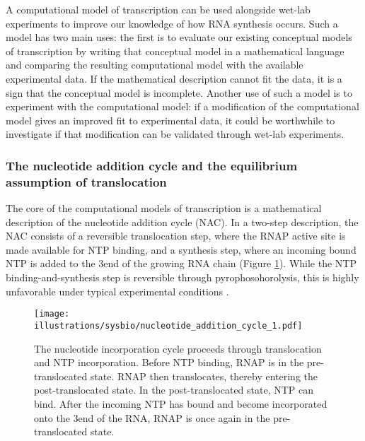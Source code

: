 %
%
A computational model of transcription can be used alongside wet-lab experiments
to improve our knowledge of how RNA synthesis occurs. Such a model has two
main uses: the first is to evaluate our existing conceptual models of
transcription by writing that conceptual model in a mathematical language and
comparing the resulting computational model with the available experimental
data. If the mathematical description cannot fit the data, it is a sign that
the conceptual model is incomplete. Another use of such a model is to
experiment with the computational model: if a modification of the computational
model gives an improved fit to experimental data, it could be worthwhile to
investigate if that modification can be validated through wet-lab experiments.

\subsubsection{The nucleotide addition cycle and the equilibrium assumption of
translocation}
The core of the computational models of transcription is a mathematical
description of the nucleotide addition cycle (NAC). In a two-step description,
the NAC consists of a reversible translocation step, where the RNAP active site
is made available for NTP binding, and a synthesis step, where an incoming
bound NTP is added to the 3\ppp end of the growing RNA chain (Figure
\ref{fig:nac_1}). While the NTP binding-and-synthesis step is reversible
through pyrophosohorolysis, this is highly unfavorable under typical
experimental conditions \cite{buc_chapter_2009}.
\begin{figure}[htb]
	\begin{center}
		\texttt{[image: illustrations/sysbio/nucleotide\_addition\_cycle\_1.pdf]}
	\end{center}
	\caption{The nucleotide incorporation cycle proceeds through
	translocation and NTP incorporation. Before NTP binding, RNAP is in the
	pre-translocated state. RNAP then translocates, thereby entering the
	post-translocated state. In the post-translocated state, NTP can bind.
    After the incoming NTP has bound and become incorporated onto the
    3\protect\ppp end of the RNA, RNAP is once again in the pre-translocated
    state.}
	\label{fig:nac_1}
\end{figure}

